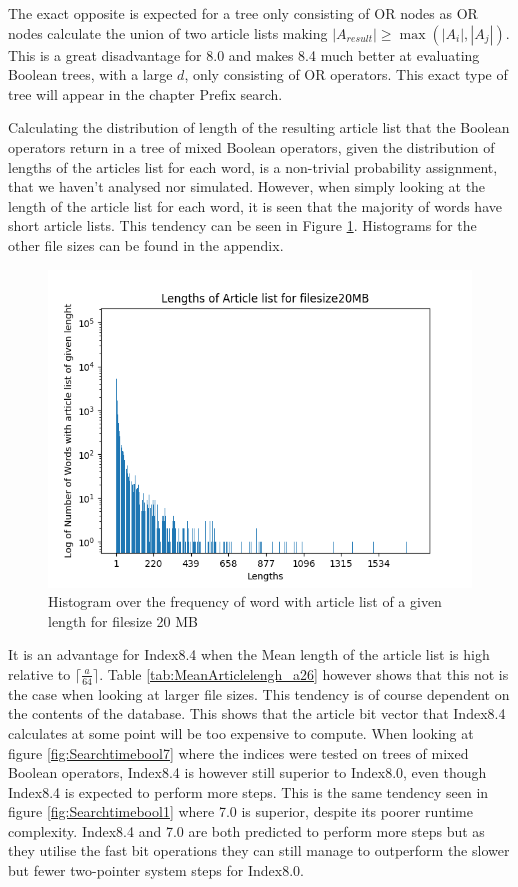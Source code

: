 The exact opposite is expected for a tree only consisting of OR nodes as OR nodes calculate the union of two article lists making $|A_{result}|\geq \max(|A_i|,|A_j|)$. This is a great disadvantage for 8.0 and makes 8.4 much better at evaluating Boolean trees, with a large $d$, only consisting of OR operators. This exact type of tree will appear in the chapter Prefix search.

Calculating the distribution of length of the resulting article list that the Boolean operators return in a tree of mixed Boolean operators, given the distribution of lengths of the articles list for each word, is a non-trivial probability assignment, that we haven't analysed nor simulated. However, when simply looking at the length of the article list for each word, it is seen that the majority of words have short article lists. This tendency can be seen in Figure \ref{fig:Articlelength20}. Histograms for the other file sizes can be found in the appendix.

\begin{figure}[ht!]
    \centering
    \includegraphics[width=.7\textwidth]{LaTeX/Pictures/Results/ArticleLengthg20MB.png}
    \caption{Histogram over the frequency of word with article list of a given length for filesize 20 MB}
    \label{fig:Articlelength20}
\end{figure}

It is an advantage for Index8.4 when the Mean length of the article list is high relative to $\lceil \frac{a}{64} \rceil$. Table \ref{tab:MeanArticlelengh_a26} however shows that this not is the case when looking at larger file sizes. This tendency is of course dependent on the contents of the database. This shows that the article bit vector that Index8.4 calculates at some point will be too expensive to compute. When looking at figure \ref{fig:Searchtimebool7} where the indices were tested on trees of mixed Boolean operators, Index8.4 is however still superior to Index8.0, even though Index8.4 is expected to perform more steps. This is the same tendency seen in figure \ref{fig:Searchtimebool1} where 7.0 is superior, despite its poorer runtime complexity. Index8.4 and 7.0 are both predicted to perform more steps but as they utilise the fast bit operations they can still manage to outperform the slower but fewer two-pointer system steps for Index8.0. 

